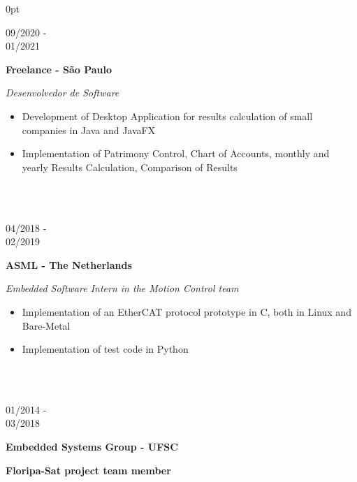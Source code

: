 \documentclass[a4paper]{article}
\begin{document}
\begin{adjustwidth}{\parindent}{0pt}
\begin{minipage}[t]{0.65\textwidth}
  \begin{minipage}[t]{0.2\textwidth}
    \large{09/2020 - \\ 01/2021}
    \end{minipage}
    \begin{minipage}[t]{0.8\textwidth}
    {
      \setlength{\parskip}{5.5pt}
      \Large{\textbf{Freelance - São Paulo}}
    
      \large{\textit{Desenvolvedor de Software}}
      \begin{itemize}
        \item \normalsize{Development of Desktop Application for results calculation of small companies in Java and JavaFX}
        \item \normalsize{Implementation of Patrimony Control, Chart of Accounts, monthly and yearly Results Calculation, Comparison of Results}
      \end{itemize}
    }
    \end{minipage} \\ \\

	\begin{minipage}[t]{0.2\textwidth}
	\large{04/2018 - \\ 02/2019}
	\end{minipage}
	\begin{minipage}[t]{0.8\textwidth}
	{
	  \setlength{\parskip}{5.5pt}
	  \Large{\textbf{ASML - The Netherlands}}
	  
	  \large{\textit{Embedded Software Intern in the Motion Control team}}
	  \begin{itemize}
	    \item \normalsize{Implementation of an EtherCAT protocol prototype in C, both in Linux and Bare-Metal}
	    \item \normalsize{Implementation of test code in Python}
	  \end{itemize}
	}
\end{minipage} \\ \\

\begin{minipage}[t]{0.2\textwidth}
  \large{01/2014 - \\ 03/2018}
\end{minipage}
\begin{minipage}[t]{0.8\textwidth}
{
  \setlength{\parskip}{5.5pt}
  \Large{\textbf{Embedded Systems Group - UFSC}}
  
  \large{\textbf{Floripa-Sat project team member}}
  
}
\end{minipage}
\end{minipage}
\end{adjustwidth}
\end{document}
